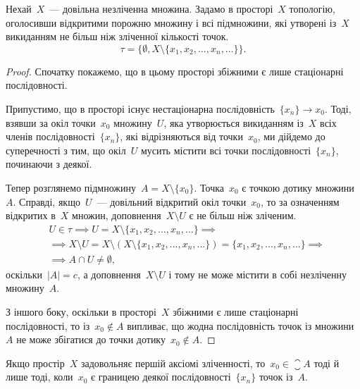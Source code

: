 \begin{example}
Нехай~$X$~--- довільна незліченна множина.
Задамо в просторі~$X$ топологію, оголосивши відкритими
порожню множину і всі підмножини, які утворені із~$X$
викиданням не більш ніж зліченної кількості точок.
\[ \tau = \{ \emptyset, X \setminus \{ x_1, x_2, \ldots, x_n, \ldots\} \}. \]
\end{example}

\begin{proof}
Спочатку покажемо, що в цьому просторі збіжними є
лише стаціонарні послідовності.

Припустимо, що в просторі
існує нестаціонарна послідовність~$\{x_n\} \to x_0$. Тоді, взявши за окіл точки~$x_0$ множину~$U$, яка утворюється
викиданням із~$X$ всіх членів послідовності~$\{x_n\}$, які
відрізняються від точки~$x_0$, ми дійдемо до суперечності з тим,
що окіл~$U$ мусить містити всі точки послідовності~$\{x_n\}$,
починаючи з деякої.

Тепер розглянемо підмножину~$A = X \setminus \{x_0\}$. Точка~$x_0$ є
точкою дотику множини~$A$. Справді, якщо~$U$~--- довільний
відкритий окіл точки~$x_0$, то за означенням відкритих в~$X$
множин, доповнення~$X \setminus U$ є не більш ніж зліченим.
\begin{align*}
& U \in \tau \implies U = X \setminus \{ x_1, x_2, \ldots, x_n, \ldots \} \implies \\
& \implies X \setminus U = X \setminus (X \setminus \{ x_1, x_2, \ldots, x_n, \ldots \}) = \{ x_1, x_2, \ldots, x_n, \ldots \} \implies \\
& \implies A \cap U \ne \emptyset,
\end{align*}
оскільки~$|A| = c$, а доповнення~$X \setminus U$ і
тому не може містити в собі незліченну множину~$A$.

З іншого боку, оскільки в просторі~$X$ збіжними є лише
стаціонарні послідовності, то із~$x_0 \notin A$ випливає, що жодна
послідовність точок із множини~$A$ не може збігатися до
точки дотику~$x_0 \notin A$.
\end{proof}

\begin{theorem}
Якщо простір~$X$ задовольняє першій аксіомі
зліченності, то~$x_0 \in \closure{A}$ тоді й лише тоді, коли~$x_0$ є границею
деякої послідовності~$\{x_n\}$ точок із~$A$.
\end{theorem}

